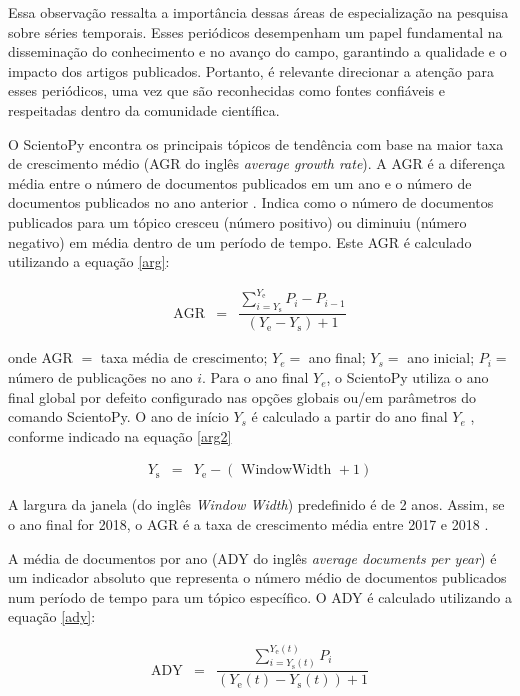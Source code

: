 Essa observação ressalta a importância dessas áreas de especialização na pesquisa sobre séries temporais. Esses periódicos desempenham um papel fundamental na disseminação do conhecimento e no avanço do campo, garantindo a qualidade e o impacto dos artigos publicados. Portanto, é relevante direcionar a atenção para esses periódicos, uma vez que são reconhecidas como fontes confiáveis e respeitadas dentro da comunidade científica.


O ScientoPy encontra os principais tópicos de tendência com base na maior taxa de crescimento médio (AGR do inglês \textit{average growth rate}). A AGR é a diferença média entre o número de documentos publicados em um ano e o número de documentos publicados no ano anterior \cite{scientopy}. Indica como o número de documentos publicados para um tópico cresceu (número positivo) ou diminuiu (número negativo) em média dentro de um período de tempo. Este AGR é calculado utilizando a equação \eqref{arg}:


\begin{eqnarray}
	\mathrm{AGR}&=&\dfrac{\sum_{i=Y_{\mathrm{s}}}^{Y_{\mathrm{e}}} P_i-P_{i-1}}{\left(Y_{\mathrm{e}}-Y_{\mathrm{s}}\right)+1} \label{arg}
\end{eqnarray}

\noindent onde AGR $=$ taxa média de crescimento; $Y_e =$ ano final; $Y_s =$ ano inicial; $P_i =$ número de publicações no ano $i$.
Para o ano final $Y_e$, o ScientoPy utiliza o ano final global por defeito configurado nas opções globais ou/em parâmetros do comando ScientoPy. O ano de início $Y_s$ é calculado a partir do ano final $Y_e$ , conforme indicado na equação \eqref{arg2}

\begin{eqnarray}
	Y_{\mathrm{s}}&=&Y_{\mathrm{e}}-(\text { WindowWidth }+1)\label{arg2}
\end{eqnarray}

A largura da janela (do inglês \textit{Window Width}) predefinido é de 2 anos. Assim, se o ano final for 2018, o AGR é a taxa de crescimento média entre 2017 e 2018 \cite{scientopy}.

A média de documentos por ano (ADY do inglês \textit{average documents per year}) é um indicador absoluto que representa o número médio de documentos publicados num período de tempo para um tópico específico. O ADY é calculado utilizando a equação \eqref{ady}:

\begin{eqnarray}
	\mathrm{ADY}&=&\dfrac{\sum_{i={Y_{\mathrm{s}}}(t)}^{Y_{\mathrm{e}}(t)} P_i}{\left(Y_{\mathrm{e}}(t)-Y_{\mathrm{s}}(t)\right)+1}\label{ady}
\end{eqnarray}

